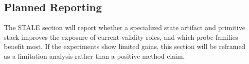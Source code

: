 \subsection{Planned Reporting}
\label{subsec:stale-reporting}

The STALE section will report whether a specialized state artifact and primitive stack improves the exposure of current-validity roles, and which probe families benefit most.
If the experiments show limited gains, this section will be reframed as a limitation analysis rather than a positive method claim.


